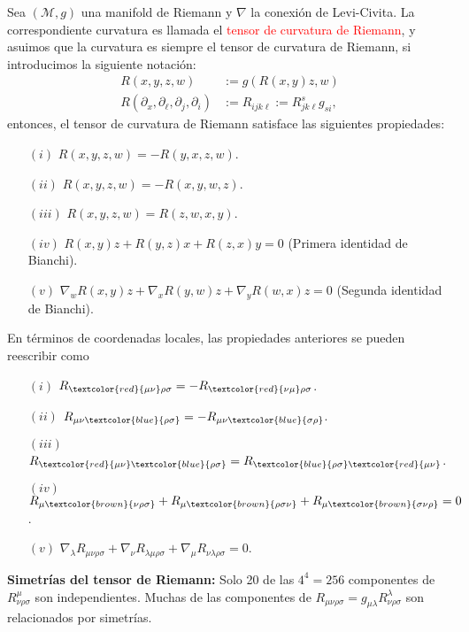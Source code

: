 \documentclass[../main]{subfiles}
\begin{document}
\begin{adjustwidth}{0pt}{-100pt}
Sea $(\mathcal{M}, g)$ una manifold de Riemann y $\nabla$ la conexión de Levi-Civita. La correspondiente curvatura es llamada el \textcolor{red}{tensor de curvatura de Riemann}, y asuimos que la curvatura es siempre el tensor de curvatura de Riemann, si introducimos la siguiente notación:
\begin{align}
    R(x, y, z, w)&:=g(R(x,y)z, w)\\
    R(\partial_x, \partial_{\ell}, \partial_j, \partial_i)&:=R_{ijk\ell}:= R^s_{jk\ell}g_{si},
\end{align}
entonces, el tensor de curvatura de Riemann satisface las siguientes propiedades:
\begin{enumerate}
    \item[$(i)$] $R(x, y, z, w)=-R(y, x, z, w)$.
    \item[$(ii)$] $R(x, y, z, w)=-R(x, y, w, z)$.
    \item[$(iii)$] $R(x, y, z, w)= R(z, w, x, y)$.
    \item[$(iv)$] $R(x, y)z+R(y, z)x+R(z, x)y=0$ (Primera identidad de Bianchi).
    \item[$(v)$] $\nabla_w R(x, y)z+\nabla_x R(y, w)z+\nabla_y R(w, x)z=0$ (Segunda identidad de Bianchi).    
\end{enumerate}

En términos de coordenadas locales, las propiedades anteriores se pueden reescribir como 
\begin{enumerate}
    \item[$(i)$] $R_{\textcolor{red}{\mu\nu}\rho\sigma}=-R_{\textcolor{red}{\nu\mu}\rho\sigma}$.
    \item[$(ii)$] $R_{\mu\nu\textcolor{blue}{\rho\sigma}}=-R_{\mu\nu\textcolor{blue}{\sigma\rho}}$.
    \item[$(iii)$] $R_{\textcolor{red}{\mu\nu}\textcolor{blue}{\rho\sigma}}=R_{\textcolor{blue}{\rho\sigma}\textcolor{red}{\mu\nu}}$.
    \item[$(iv)$] $R_{\mu\textcolor{brown}{\nu\rho\sigma}}+R_{\mu\textcolor{brown}{\rho\sigma\nu}}+R_{\mu\textcolor{brown}{\sigma\nu\rho}}=0$.
    \item[$(v)$] $\nabla_{\lambda} R_{\mu\nu\rho\sigma}+\nabla_{\nu}R_{\lambda\mu\rho\sigma}+\nabla_{\mu}R_{\nu\lambda\rho\sigma}=0$.     
\end{enumerate}

\textbf{Simetrías del tensor de Riemann:} Solo 20 de las $4^4=256$ componentes de $R^{\mu}_{\nu\rho\sigma}$ son independientes. Muchas de las componentes de $R_{\mu\nu\rho\sigma}=g_{\mu\lambda}R^{\lambda}_{\nu\rho\sigma}$ son relacionados por simetrías.


\end{adjustwidth}
\end{document}
